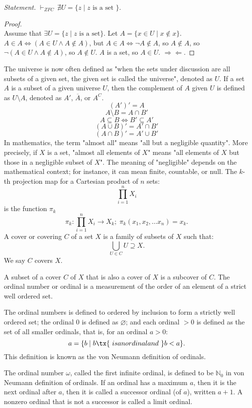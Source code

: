 \documentclass[a4paper,12pt]{report}
\begin{document}
\begin{itemizle}
\textit{Statement.} $\vdash_{ZFC}\,\nexists U = \{z \mid z\text{\ is a set\ }\}$.
\begin{proof}\mbox{}\\
Assume that $\exists U = \{z \mid z\text{ is a set}\}$. Let $A=\{x\in U \mid x\notin x\}$. $A \in A\iff (A\in U \land A\notin A)$, but $A\in A \iff \neg A \notin A$, so $A\notin A$, so $\neg(A \in U \land A \notin A)$, so $A \notin U$. $A$ is a set, so $A\in U$. $\Rightarrow\Leftarrow$.
\end{proof}
The universe is now often defined as "when the sets under discussion are all subsets of a given set, the given set is called the universe", denoted as $U$.
If a set $A$ is a subset of a given universe $U$, then the complement of $A$ given $U$ is defined as $U\setminus A$, denoted as $A'$, $\overline{A}$, or $A^C$.
\[(A')'=A\]
\[A\setminus B = A\cap B'\]
\[A\subseteq B \iff B' \subseteq A'\]
\[(A\cup B)'=A'\cap B'\]
\[(A\cap B)'=A'\cup B'\]
In mathematics, the term "almost all" means "all but a negligible quantity". More precisely, if $X$ is a set, "almost all elements of $X$" means "all elements of $X$ but those in a negligible subset of $X$". The meaning of "negligible" depends on the mathematical context; for instance, it can mean finite, countable, or null.
The $k$-th projection map for a Cartesian product of $n$ sets:
\[\prod_{i=1}^nX_i\]
is the function $\pi_k$
\[\pi_k\colon\prod_{i=1}^nX_i\to X_k;\;\pi_k(x_1,x_2,\ldots x_n)=x_k.\]
A cover or covering $C$ of a set $X$ is a family of subsets of $X$ such that:
\[\bigcup_{U\in C}U\supseteq X.\]
We say $C$ covers $X$.

A subset of a cover $C$ of $X$ that is also a cover of $X$ is a subcover of $C$.
The ordinal number or ordinal is a measurement of the order of an element of a strict well ordered set.

The ordinal numbers is defined to ordered by inclusion to form a strictly well ordered set; the ordinal $0$ is defined as $\varnothing$; and each ordinal $>0$ is defined as the set of all smaller ordinals, that is, for an ordinal $a>0$:
\[a=\{b\mid b\tx{\ is an ordinal and\ }b<a\}.\]
This definition is known as the von Neumann definition of ordinals.

The ordinal number $\omega$, called the first infinite ordinal, is defined to be $\mathbb{N}_0$ in von Neumann definition of ordinals.
If an ordinal has a maximum $a$, then it is the next ordinal after $a$, then it is called a successor ordinal (of $a$), written $a+1$.
A nonzero ordinal that is not a successor is called a limit ordinal.

\end{itemizle}
\end{document}
